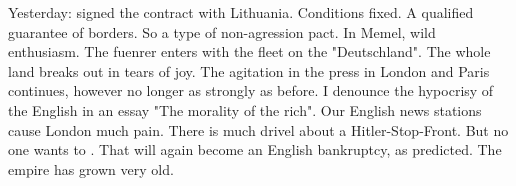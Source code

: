 Yesterday: signed the contract with Lithuania. Conditions fixed. A qualified guarantee of borders. So a type of non-agression pact. In Memel, wild enthusiasm. The fuenrer enters with the fleet on the "Deutschland". The whole land breaks out in tears of joy. The agitation in the press in London and Paris continues, however no longer as strongly as before. I denounce the hypocrisy of the English in an essay "The morality of the rich". Our English news stations cause London much pain. There is much drivel about a Hitler-Stop-Front. But no one wants to . That will again become an English bankruptcy, as predicted. The empire has grown very old. \missing

